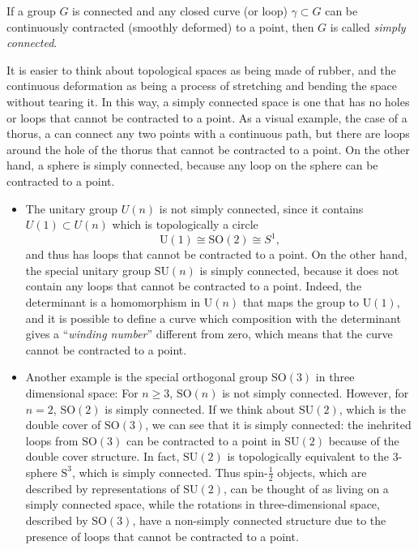 \begin{definition}
    If a group \(G\) is connected and any closed curve (or loop) \(\gamma \subset G\) can be continuously contracted (smoothly deformed) to a point, then \(G\) is called \textit{simply connected}.
\end{definition}

It is easier to think about topological spaces as being made of rubber, and the continuous deformation as being a process of stretching and bending the space without tearing it. In this way, a simply connected space is one that has no holes or loops that cannot be contracted to a point. As a visual example, the case of a thorus, a can connect any two points with a continuous path, but there are loops around the hole of the thorus that cannot be contracted to a point. On the other hand, a sphere is simply connected, because any loop on the sphere can be contracted to a point.

\begin{example}
    \begin{itemize}
        \item The unitary group \(U(n)\) is not simply connected, since it contains \(U(1) \subset U(n)\) which is topologically a circle
              \[
                  \mathrm{U}(1) \cong \mathrm{SO}(2) \cong S^1,
              \]
              and thus has loops that cannot be contracted to a point. On the other hand, the special unitary group \(\mathrm{SU}(n)\) is simply connected, because it does not contain any loops that cannot be contracted to a point. Indeed, the determinant is a homomorphism in \(\mathrm{U}(n)\) that maps the group to \(\mathrm{U}(1)\), and it is possible to define a curve which composition with the determinant gives a ``\textit{winding number}'' different from zero, which means that the curve cannot be contracted to a point.

        \item Another example is the special orthogonal group \(\mathrm{SO}(3)\) in three dimensional space: For \(n \geq 3\), \(\mathrm{SO}(n)\) is not simply connected. However, for \(n = 2\), \(\mathrm{SO}(2)\) is simply connected. If we think about \(\mathrm{SU}(2)\), which is the double cover of \(\mathrm{SO}(3)\), we can see that it is simply connected: the inehrited loops from \(\mathrm{SO}(3)\) can be contracted to a point in \(\mathrm{SU}(2)\) because of the double cover structure. In fact, \(\mathrm{SU}(2)\) is topologically equivalent to the 3-sphere \(\mathrm{S}^3\), which is simply connected. Thus spin-\(\tfrac{1}{2}\) objects, which are described by representations of \(\mathrm{SU}(2)\), can be thought of as living on a simply connected space, while the rotations in three-dimensional space, described by \(\mathrm{SO}(3)\), have a non-simply connected structure due to the presence of loops that cannot be contracted to a point.
    \end{itemize}
\end{example}

